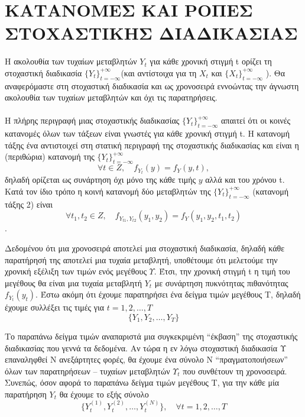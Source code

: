 \section{ΚΑΤΑΝΟΜΕΣ ΚΑΙ ΡΟΠΕΣ ΣΤΟΧΑΣΤΙΚΗΣ ΔΙΑΔΙΚΑΣΙΑΣ }
Η ακολουθία των τυχαίων μεταβλητών $Y_t$ για κάθε χρονική στιγμή t ορίζει τη
στοχαστική διαδικασία $ \{Y_t\}_{t=-\infty}^{+\infty}$(και αντίστοιχα για τη $X_t$ και $ \{X_t\}_{t=-\infty}^{+\infty}$ ). Θα
αναφερόμαστε στη στοχαστική διαδικασία και ως χρονοσειρά εννοώντας την
άγνωστη ακολουθία των τυχαίων μεταβλητών και όχι τις παρατηρήσεις. \\ \\
Η πλήρης περιγραφή μιας στοχαστικής διαδικασίας $\{Y_t\}_{t=-\infty}^{+\infty} $ απαιτεί ότι οι κοινές
κατανομές όλων των τάξεων
 είναι γνωστές για κάθε χρονική στιγμή t.
Η κατανομή τάξης ένα αντιστοιχεί στη στατική περιγραφή της στοχαστικής
διαδικασίας και είναι η (περιθώρια) κατανομή της $\{Y_t\}_{t=-\infty}^{+\infty} $\\
$$ \forall t \in Z, \quad f_{Y_t}\left(y\right)=f_Y\left(y,t\right),$$
δηλαδή ορίζεται ως συνάρτηση όχι μόνο της κάθε τιμής $y$ αλλά και του χρόνου t. Κατά τον ίδιο τρόπο η κοινή κατανομή δύο μεταβλητών της $\{Y_t\}_{t=-\infty}^{+\infty} $ (κατανομή τάξης
2) είναι\\
$$ \forall t_1,t_2 \in Z,\quad f_{Y_{t1},Y_{t2}} \left(y_1,y_2\right)= f_Y\left(y_1,y_2,t_1,t_2\right)$$.






Δεδομένου ότι μια χρονοσειρά αποτελεί μια στοχαστική διαδικασία,
δηλαδή κάθε παρατήρησή της αποτελεί μια τυχαία μεταβλητή,
υποθέτουμε ότι μελετούμε την χρονική εξέλιξη των τιμών ενός μεγέθους $Υ$. Έτσι,
την χρονική στιγμή t η τιμή του μεγέθους θα είναι μια τυχαία μεταβλητή $Y_t$ με
συνάρτηση πυκνότητας πιθανότητας
$f_{Y_t} \left(y_t \right)$. Έστω ακόμη ότι έχουμε παρατηρήσει ένα
δείγμα τιμών μεγέθους Τ, δηλαδή έχουμε συλλέξει τις τιμές για $t = 1, 2,\ldots,T$
$$\{ Y_1,Y_2,\ldots,Y_T \} $$

Το παραπάνω δείγμα τιμών αναπαριστά μια συγκεκριμένη “έκβαση” της στοχαστικής
διαδικασίας που γεννά τα δεδομένα. Αν τώρα η εν λόγω στοχαστική διαδικασία Υ
επαναληφθεί Ν ανεξάρτητες φορές, θα έχουμε ένα σύνολο Ν “πραγματοποιήσεων” όλων
των παρατηρήσεων – τυχαίων μεταβλητών $Υ_t$ που συνθέτουν τη χρονοσειρά. Συνεπώς,
όσον αφορά το παραπάνω δείγμα τιμών μεγέθους Τ, για την κάθε μία παρατήρηση $Y_t$ θα
έχουμε το εξής σύνολο\\
$$ \{Y_t^{\left(1\right)},Y_t^{\left(2\right)},\ldots, Y_t^{\left(N\right)}\},\quad \forall t=1,2,\ldots,T$$


